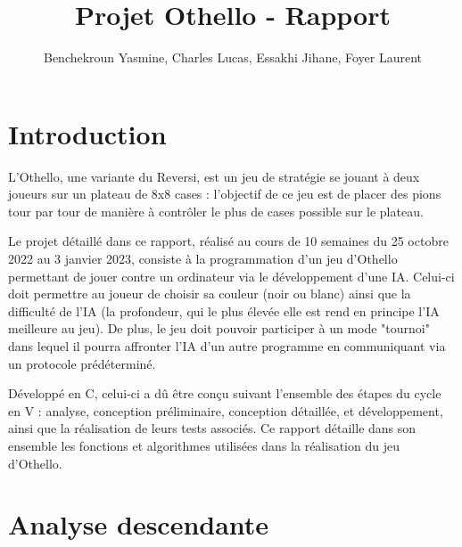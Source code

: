 \documentclass{report}
\title{Projet Othello - Rapport}
\author{Benchekroun Yasmine, Charles Lucas, Essakhi Jihane, Foyer Laurent}
\begin{document}
  
\maketitle

\chapter{Introduction}

    L'Othello, une variante du Reversi, est un jeu de stratégie se jouant à deux joueurs sur un plateau de 8x8 cases : l'objectif de ce jeu est de placer des pions tour par tour de manière à contrôler le plus de cases possible sur le plateau. \par
    
    Le projet détaillé dans ce rapport, réalisé au cours de 10 semaines du 25 octobre 2022 au 3 janvier 2023, consiste à la programmation d'un jeu d'Othello permettant de jouer contre un ordinateur via le développement d'une IA. Celui-ci doit permettre au joueur de choisir sa couleur (noir ou blanc) ainsi que la difficulté de l'IA (la profondeur, qui le plus élevée elle est rend en principe l'IA meilleure au jeu). De plus, le jeu doit pouvoir participer à un mode "tournoi" dans lequel il pourra affronter l'IA d'un autre programme en communiquant via un protocole prédéterminé. \par

    Développé en C, celui-ci a dû être conçu suivant l'ensemble des étapes du cycle en V : analyse, conception préliminaire, conception détaillée, et développement, ainsi que la réalisation de leurs tests associés. Ce rapport détaille dans son ensemble les fonctions et algorithmes utilisées dans la réalisation du jeu d'Othello.

\chapter{Analyse descendante}
    \vspace*{2cm}
    \noindent
    \vspace*{\fill}
\end{document}

